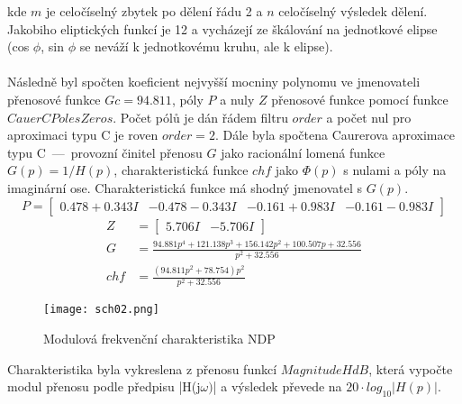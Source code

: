 \noindent kde $m$ je celočíselný zbytek po dělení řádu 2 a $n$ celočíselný výsledek dělení. Jakobiho eliptických funkcí je 12 a vycházejí ze škálování na jednotkové elipse (cos $\phi$, sin $\phi$ se neváží k jednotkovému kruhu, ale k elipse). \\
\\
Následně byl spočten koeficient nejvyšší mocniny polynomu ve jmenovateli přenosové funkce $Gc = 94.811$, póly $P$ a nuly $Z$ přenosové funkce pomocí funkce $CauerCPolesZeros$. Počet pólů je dán řádem filtru $order$ a počet nul pro aproximaci typu C je roven $order = 2$. Dále byla spočtena Caurerova aproximace typu C~---~provozní činitel přenosu $G$ jako racionální lomená funkce $G(p) = 1/H(p)$, charakteristická funkce $chf$ jako $\Phi(p)$ s nulami a póly na imaginární ose. Charakteristická funkce má shodný jmenovatel s $G(p)$.
\begin{equation}
P = 
\begin{bmatrix}
0.478 + 0.343 I & -0.478 - 0.343 I & -0.161 + 0.983 I & -0.161 - 0.983 I
\end{bmatrix}
\end{equation}
\begin{align}
Z &=
\begin{bmatrix}
5.706 I & -5.706 I
\end{bmatrix}\\
G &= \frac{94.881p^4+121.138p^3+156.142p^2+100.507p+32.556}{p^2+32.556}\\
chf &= \frac{(94.811p^2+78.754)p^2}{p^2+32.556}
\end{align}
\begin{figure}[h]
\centering
\texttt{[image: sch02.png]}
\caption{Modulová frekvenční charakteristika NDP}
\end{figure}
\noindent Charakteristika byla vykreslena z přenosu funkcí $MagnitudeHdB$, která vypočte modul přenosu podle předpisu |H(j$\omega)$| a výsledek převede na $20 \cdot log_{10} |H(p)|$.
